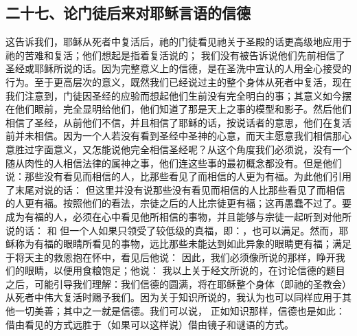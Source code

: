 
\subsection{二十七、论门徒后来对耶稣言语的信德}

 这告诉我们，耶稣从死者中复活后，祂的门徒看见祂关于圣殿的话更高级地应用于祂的苦难和复活；他们想起是指着复活说的； 我们没有被告诉说他们先前相信了圣经或耶稣所说的话。因为完整意义上的信德，是在圣洗中宣认的人用全心接受的行为。至于更高层次的意义，既然我们已经说过主的整个身体从死者中复活，现在我们注意到，门徒因圣经的应验而想起他们生前没有完全明白的事；其意义如今摆在他们眼前，完全显明给他们，他们知道了那是天上之事的模型和影子。然后他们相信了圣经，从前他们不信，并且相信了耶稣的话，按说话者的意思，他们在复活前并未相信。因为一个人若没有看到圣经中圣神的心意，而天主愿意我们相信那心意胜过字面意义，又怎能说他完全相信圣经呢？从这个角度我们必须说，没有一个随从肉性的人相信法律的属神之事，他们连这些事的最初概念都没有。但是他们说：那些没有看见而相信的人，比那些看见了而相信的人更为有福。为此他们引用了末尾对说的话： 但这里并没有说那些没有看见而相信的人比那些看见了而相信的人更有福。按照他们的看法，宗徒之后的人比宗徒更有福；这再愚蠢不过了。要成为有福的人，必须在心中看见他所相信的事物，并且能够与宗徒一起听到对他所说的话： 和 但一个人如果只领受了较低级的真福，即：，也可以满足。然而，耶稣称为有福的眼睛所看见的事物，远比那些未能达到如此异象的眼睛更有福；满足于将天主的救恩抱在怀中，看见后他说： 因此，我们必须像所说的那样，睁开我们的眼睛，以便用食粮饱足；他说： 我以上关于经文所说的，在讨论信德的题目之后，可能引导我们理解：我们信德的圆满，将在耶稣整个身体（即祂的圣教会）从死者中伟大复活时赐予我们。因为关于知识所说的，我认为也可以同样应用于其他一切美善；其中之一就是信德。我们可以说， 正如知识那样，信德也是如此：借由看见的方式远胜于（如果可以这样说）借由镜子和谜语的方式。\par

